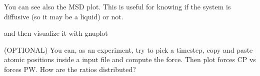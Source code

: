 \documentclass[landscape]{foils}
\begin{document}
You can see also the MSD plot. This is useful for knowing if the system is diffusive (so it may be a liquid) or not.


and then visualize it with gnuplot


(OPTIONAL) You can, as an experiment, try to pick a timestep, copy and paste atomic positions inside a  input file and compute the force. Then plot forces CP vs forces PW. How are the ratios distributed?
\end{document}
